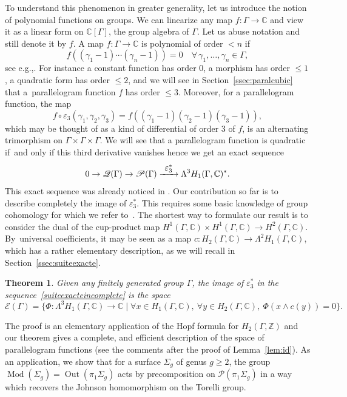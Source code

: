 \documentclass[11pt]{article}
\newcommand{\eg}{e.g.,\xspace}
\let\mathcal\mathscr
\let\ra\rightarrow
\def\To#1{\mathchoice{\xrightarrow{\textstyle\kern4pt#1\kern3pt}}{\stackrel{#1}{\longrightarrow}}{}{}}
\newtheorem{theorem}{Theorem}[section]
\theoremstyle{definition}
\newcommand{\ZZ}{\mathbb{Z}}
\newcommand{\CC}{\mathbb{C}}
\begin{document}
To understand this phenomenon in greater generality, let us introduce the
notion of polynomial functions on groups. We can linearize any map
$f:\Gamma\to \CC$ and view it as a linear form on $\CC[\Gamma]$, the
group algebra of $\Gamma$. Let us abuse notation and still denote it by $f$.
A map $f:\Gamma\to\CC$ is polynomial of order $< n$ if
\[ f((\gamma_1-1)\cdots(\gamma_n-1))=0\quad
\forall \,\gamma_1,\ldots,\gamma_n\in \Gamma, \]
see \eg \cite[Chap.\,5]{Passi}.
For instance a constant function has order $0$, a morphism has order
$\leq 1$, a quadratic form
has order $\leq 2$, and we will see in Section~\ref{ssec:paralcubic}
that a~parallelogram function $f$ has order $\leq 3$.
Moreover, for a parallelogram function, the map
\[ f\circ\varepsilon_3(\gamma_1,\gamma_2,\gamma_3)=
f((\gamma_1-1)(\gamma_2-1)(\gamma_3-1)), \]
which may be thought of as a kind of differential of order 3 of $f$,
is an alternating trimorphism on
$\Gamma\times\Gamma\times\Gamma$.
We will see that a parallelogram function is quadratic if~and only if
this third derivative vanishes hence we get an exact sequence
\begin{equation}\label{suiteexacteincomplete}
0\to\mathcal{Q}(\Gamma)\to \mathcal{P}(\Gamma)\To
{\varepsilon_3^*} \Lambda^3 H_1(\Gamma,\CC)^*.
\end{equation}
This exact sequence was already noticed in \cite{Chenevier,FriisStetkaer}.
Our contribution so far is to describe completely the image of $\varepsilon_3^*$.
This requires some basic knowledge of group cohomology for which we refer
to~\cite{Brown}. The shortest way to formulate our result is to consider
the dual of the cup-product map
$H^1(\Gamma,\CC) \times H^1(\Gamma,\CC)\to H^2(\Gamma,\CC)$.
By~universal coefficients, it may be seen as a map
$c:H_2(\Gamma,\CC)\to \Lambda^2 H_1(\Gamma,\CC)$,
which has a rather elementary description, as we will recall
in Section~\ref{ssec:suiteexacte}.
\begin{theorem}\label{theo:parallel}
Given any finitely generated group $\Gamma$, the image of
$\varepsilon_3^*$ in the sequence~\eqref{suiteexacteincomplete} is the
space
\[\mathcal{E}(\Gamma)=\bigl\lbrace
\Phi\colon\Lambda^3H_1(\Gamma,\CC)\ra\CC\mid\forall x\in H_1(\Gamma,\CC),\
\forall y\in H_2(\Gamma,\CC),\ \Phi(x\wedge c(y))=0
\bigr\rbrace. \]
\end{theorem}
The proof is an elementary application of the Hopf formula for
$H_2(\Gamma,\ZZ)$ and our theorem gives a complete, and efficient
description of the space of parallelogram functions (see the comments
after the proof of Lemma~\ref{lem:id}).
As an application, we show that for a surface $\Sigma_g$ of genus $g\geq 2$,
the group
$\operatorname{Mod}(\Sigma_g)=\operatorname{Out}(\pi_1 \Sigma_g)$ acts by
precomposition on $\mathcal{P}(\pi_1\Sigma_g)$ in a way which recovers
the Johnson homomorphism on the Torelli group.
\end{document}
